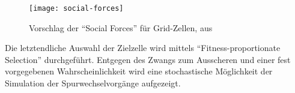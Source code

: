 \begin{figure}[hptb]
 \centering
 \texttt{[image: social-forces]}
 \caption[\enquote{Social Forces} für Grid-Zellen]{Vorschlag der \enquote{Social Forces} für Grid-Zellen, aus \cite{dat-ba}}
 \label{figure:social-forces}
\end{figure}

Die letztendliche Auswahl der Zielzelle wird mittels \enquote{Fitness-proportionate Selection} durchgeführt.
Entgegen des Zwangs zum Ausscheren und einer fest vorgegebenen Wahrscheinlichkeit wird eine stochastische Möglichkeit der Simulation der Spurwechselvorgänge aufgezeigt.